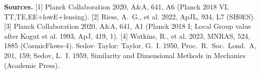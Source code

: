 \documentclass[10pt]{article}
\begin{document}
{{\textbf{Sources.} [1] Planck Collaboration 2020, A\&A, 641, A6 (Planck 2018 VI, TT,TE,EE+lowE+lensing). [2] Riess, A.~G., et al. 2022, ApJL, 934, L7 (SH0ES). [3] Planck Collaboration 2020, A\&A, 641, A1 (Planck 2018 I; Local Group value after Kogut et al. 1993, ApJ, 419, 1). [4] Watkins, R., et al. 2023, MNRAS, 524, 1885 (CosmicFlows-4). Sedov--Taylor: Taylor, G.~I. 1950, Proc.\ R.\ Soc.\ Lond.\ A, 201, 159; Sedov, L.~I. 1959, Similarity and Dimensional Methods in Mechanics (Academic Press).}

}
\end{document}

